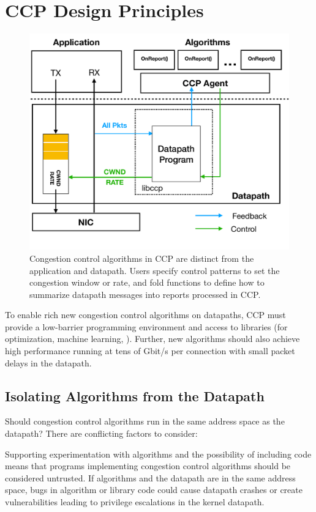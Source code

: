 \section{CCP Design Principles}
\label{s:design}
%
\begin{figure}[t]
\centering
    \includegraphics[width=\columnwidth]{img/ccp_design_sigcomm}
    \caption{Congestion control algorithms in CCP are distinct from the application and datapath.
    Users specify control patterns to set the congestion window or rate,
    and fold functions to define how to summarize datapath messages into reports processed in CCP.}\label{fig:design}
\end{figure}
%

To enable rich new congestion control algorithms on datapaths,
CCP must provide a low-barrier programming environment and access
to libraries (\eg for optimization, machine learning, \etc).
%
Further, new algorithms should also achieve high performance running at tens of
Gbit/s per connection with small packet delays in the datapath.

\subsection{Isolating Algorithms from the Datapath}
\label{s:datapath:isolation}
Should congestion control algorithms run in the same address space as the
datapath? There are conflicting factors to consider:

 Supporting experimentation with algorithms and the possibility of
including \userspace code means that programs implementing congestion
control algorithms should be considered untrusted. If algorithms and the
datapath are in the same address space, bugs in algorithm or library code could
cause datapath crashes or create vulnerabilities leading to privilege
escalations in the kernel datapath.

